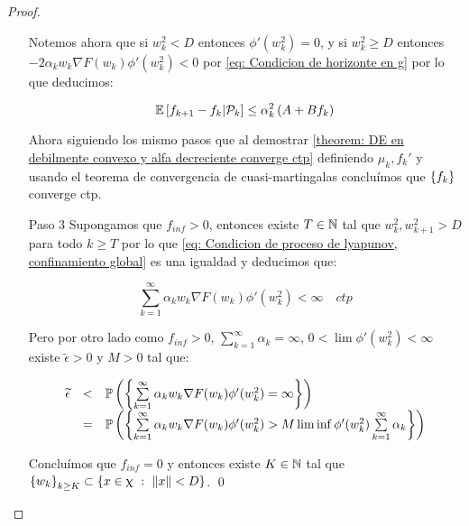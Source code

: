 \begin{proof}
\begin{enumerate}
		Notemos ahora que si $w_k^2 < D$ entonces $\phi'(w_k^2) = 0$, y si $w_k^2 \geq D$ entonces $-2 \alpha_k w_k \nabla F (w_k)\phi'(w_k^2) < 0$ por \ref{eq: Condicion de horizonte en g} por lo que deducimos:
		
		\begin{equation}
		\mathbb{E} \left[{f_{k+1} - f_k} \vert \mathcal{P}_{k}\right] \leq \alpha_k^2\left(A + B f_k\right)
		\end{equation}	
		
		
		Ahora siguiendo los mismo pasos que al demostrar \ref{theorem: DE en debilmente convexo y alfa decreciente converge ctp} definiendo $\mu_k, f_k'$ y usando el teorema de convergencia de cuasi-martingalas conclu\'imos que $\left\lbrace f_k\right\rbrace$ converge ctp.
		
		\item[Paso 3] Supongamos que $f_{inf} >0$, entonces existe $T \in {\mathbb{N}}$  tal que $w_k^2, w_{k+1}^2 > D$ para todo $k \geq T$ por lo que \ref{eq: Condicion de proceso de lyapunov, confinamiento global} es una igualdad y deducimos que:
		
		\begin{equation}
			\sum\limits_{k=1}^{\infty} {\alpha_k w_k \nabla F(w_k) \phi'(w_k^2)} < \infty \quad ctp
		\end{equation}
		
		Pero por otro lado como $f_{inf} >0$, $\sum\limits_{k=1}^{\infty} {\alpha_k} = \infty$, $0 < \lim \phi'(w_k^2) < \infty$ existe $\widetilde{\epsilon} > 0$ y $M > 0$ tal que:
		
		\begin{equation*}
			\begin{array}{rcl}
			\widetilde{\epsilon} & < & \mathbb{P} \left(\left\lbrace\sum\limits_{k=1}^{\infty} {\alpha_k w_k \nabla F(w_k) \phi'(w_k^2)} = \infty \right\rbrace\right) \\
			& = & \mathbb{P} \left(\left\lbrace\sum\limits_{k=1}^{\infty} {\alpha_k w_k \nabla F(w_k) \phi'(w_k^2)} > M \liminf \phi'(w_k^2)\sum\limits_{k=1}^{\infty} {\alpha_k}\right\rbrace\right) 
			\end{array}
		\end{equation*}
		
		Conclu\'imos que $f_{inf} = 0$ y entonces existe $K \in {\mathbb{N}}$ tal que $\left\lbrace w_k\right\rbrace_{k \geq K} \subset \left\lbrace x \in \upchi ~:~ \left\lVert x\right\rVert < D \right\rbrace$. \qed
		
	\end{enumerate}
	
\end{proof}

